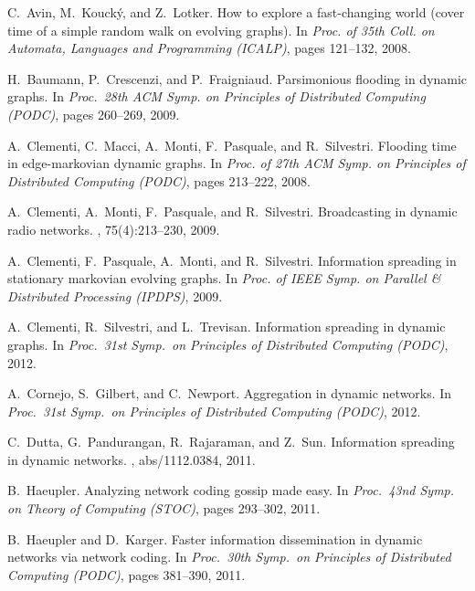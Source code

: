 \documentclass{llncs}
\begin{document}
\begin{table}[t]
\begin{thebibliography}{10}
C.~Avin, M.~Kouck\'{y}, and Z.~Lotker.
\newblock How to explore a fast-changing world (cover time of a simple random
  walk on evolving graphs).
\newblock In {\em Proc. of 35th Coll. on Automata, Languages and Programming
  (ICALP)}, pages 121--132, 2008.

H.~Baumann, P.~Crescenzi, and P.~Fraigniaud.
\newblock Parsimonious flooding in dynamic graphs.
\newblock In {\em Proc.\ 28th ACM Symp. on Principles of Distributed Computing
  (PODC)}, pages 260--269, 2009.

A.~Clementi, C.~Macci, A.~Monti, F.~Pasquale, and R.~Silvestri.
\newblock Flooding time in edge-markovian dynamic graphs.
\newblock In {\em Proc. of 27th ACM Symp. on Principles of Distributed
  Computing (PODC)}, pages 213--222, 2008.

A.~Clementi, A.~Monti, F.~Pasquale, and R.~Silvestri.
\newblock Broadcasting in dynamic radio networks.
, 75(4):213--230, 2009.

A.~Clementi, F.~Pasquale, A.~Monti, and R.~Silvestri.
\newblock Information spreading in stationary markovian evolving graphs.
\newblock In {\em Proc. of IEEE Symp. on Parallel \& Distributed Processing
  (IPDPS)}, 2009.

A.~Clementi, R.~Silvestri, and L.~Trevisan.
\newblock Information spreading in dynamic graphs.
\newblock In {\em Proc.\ 31st Symp.\ on Principles of Distributed Computing
  (PODC)}, 2012.

A.~Cornejo, S.~Gilbert, and C.~Newport.
\newblock Aggregation in dynamic networks.
\newblock In {\em Proc.\ 31st Symp.\ on Principles of Distributed Computing
  (PODC)}, 2012.

C.~Dutta, G.~Pandurangan, R.~Rajaraman, and Z.~Sun.
\newblock Information spreading in dynamic networks.
, abs/1112.0384, 2011.

B.~Haeupler.
\newblock Analyzing network coding gossip made easy.
\newblock In {\em Proc.\ 43nd Symp. on Theory of Computing (STOC)}, pages
  293--302, 2011.

B.~Haeupler and D.~Karger.
\newblock Faster information dissemination in dynamic networks via network
  coding.
\newblock In {\em Proc.\ 30th Symp.\ on Principles of Distributed Computing
  (PODC)}, pages 381--390, 2011.


\end{thebibliography}
\end{table}
\end{document}
